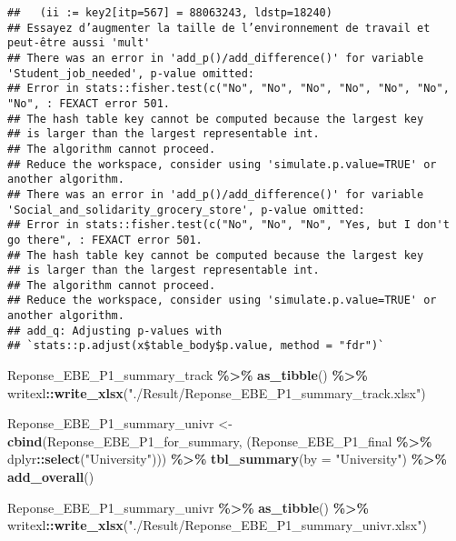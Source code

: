 \documentclass[
]{article}
\newenvironment{Shaded}{\begin{snugshade}}{\end{snugshade}}
\newcommand{\AttributeTok}[1]{\textcolor[rgb]{0.13,0.29,0.53}{#1}}
\newcommand{\FunctionTok}[1]{\textcolor[rgb]{0.13,0.29,0.53}{\textbf{#1}}}
\newcommand{\NormalTok}[1]{#1}
\newcommand{\OtherTok}[1]{\textcolor[rgb]{0.56,0.35,0.01}{#1}}
\newcommand{\SpecialCharTok}[1]{\textcolor[rgb]{0.81,0.36,0.00}{\textbf{#1}}}
\newcommand{\StringTok}[1]{\textcolor[rgb]{0.31,0.60,0.02}{#1}}
\begin{document}
\begin{verbatim}
##   (ii := key2[itp=567] = 88063243, ldstp=18240)
## Essayez d’augmenter la taille de l’environnement de travail et peut-être aussi 'mult'
## There was an error in 'add_p()/add_difference()' for variable 'Student_job_needed', p-value omitted:
## Error in stats::fisher.test(c("No", "No", "No", "No", "No", "No", "No", : FEXACT error 501.
## The hash table key cannot be computed because the largest key
## is larger than the largest representable int.
## The algorithm cannot proceed.
## Reduce the workspace, consider using 'simulate.p.value=TRUE' or another algorithm.
## There was an error in 'add_p()/add_difference()' for variable 'Social_and_solidarity_grocery_store', p-value omitted:
## Error in stats::fisher.test(c("No", "No", "No", "Yes, but I don't go there", : FEXACT error 501.
## The hash table key cannot be computed because the largest key
## is larger than the largest representable int.
## The algorithm cannot proceed.
## Reduce the workspace, consider using 'simulate.p.value=TRUE' or another algorithm.
## add_q: Adjusting p-values with
## `stats::p.adjust(x$table_body$p.value, method = "fdr")`
\end{verbatim}

\begin{Shaded}
\begin{Highlighting}[]
\NormalTok{Reponse\_EBE\_P1\_summary\_track }\SpecialCharTok{\%\textgreater{}\%} \FunctionTok{as\_tibble}\NormalTok{() }\SpecialCharTok{\%\textgreater{}\%}
\NormalTok{  writexl}\SpecialCharTok{::}\FunctionTok{write\_xlsx}\NormalTok{(}\StringTok{"./Result/Reponse\_EBE\_P1\_summary\_track.xlsx"}\NormalTok{)}



\NormalTok{Reponse\_EBE\_P1\_summary\_univr }\OtherTok{\textless{}{-}}
  \FunctionTok{cbind}\NormalTok{(Reponse\_EBE\_P1\_for\_summary, (Reponse\_EBE\_P1\_final }\SpecialCharTok{\%\textgreater{}\%}\NormalTok{ dplyr}\SpecialCharTok{::}\FunctionTok{select}\NormalTok{(}\StringTok{"University"}\NormalTok{))) }\SpecialCharTok{\%\textgreater{}\%} \FunctionTok{tbl\_summary}\NormalTok{(}\AttributeTok{by =} \StringTok{"University"}\NormalTok{) }\SpecialCharTok{\%\textgreater{}\%}
  \FunctionTok{add\_overall}\NormalTok{()}

\NormalTok{Reponse\_EBE\_P1\_summary\_univr }\SpecialCharTok{\%\textgreater{}\%} \FunctionTok{as\_tibble}\NormalTok{() }\SpecialCharTok{\%\textgreater{}\%}
\NormalTok{  writexl}\SpecialCharTok{::}\FunctionTok{write\_xlsx}\NormalTok{(}\StringTok{"./Result/Reponse\_EBE\_P1\_summary\_univr.xlsx"}\NormalTok{)}
\end{Highlighting}
\end{Shaded}
\end{document}

